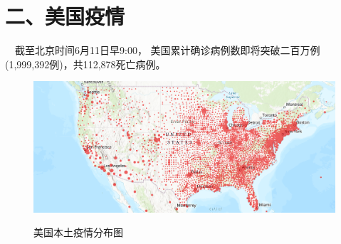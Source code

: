 \documentclass[
]{article}
\begin{document}
\vspace{-7mm}

\hypertarget{section-3}{%
\section{\texorpdfstring{\textcolor{glaucous}{\Huge 二、美国疫情}}{}}\label{section-3}}

\vspace{-5mm}

\(\quad\)截至北京时间6月11日早9:00，
美国累计确诊病例数即将突破二百万例(1,999,392例)，共112,878死亡病例。

\begin{figure}[H] 
\caption{美国本土疫情分布图} %
\centering
\includegraphics[]{./input/covid4.png} %
\label{} %
\end{figure}
\end{document}
